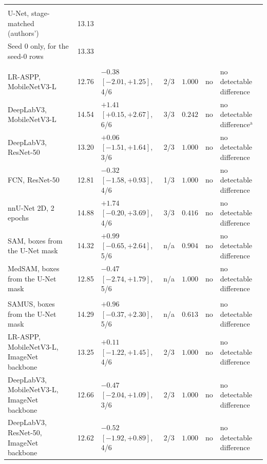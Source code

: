 \begin{table}[tp]
\begin{tabularx}{\textwidth}{@{}>{\raggedright\arraybackslash}X r l c r c >{\raggedright\arraybackslash}p{}@{}}
\multicolumn{7}{@{}l}{\quad\textit{Reference}} \\
\quad U-Net, stage-matched (authors')~\cite{ronneberger2015unet} & 13.13 &  &  &  &  &  \\
\quad\quad Seed 0 only, for the seed-0 rows & 13.33 &  &  &  &  &  \\
\multicolumn{7}{@{}l}{\quad\textit{Family ($m = 7$)}} \\
\quad LR-ASPP, MobileNetV3-L~\cite{howard2019mobilenetv3} & 12.76 & $-0.38$ $[-2.01, +1.25]$, 4/6 & 2/3 & $1.000$ & no & no detectable difference \\
\quad DeepLabV3, MobileNetV3-L~\cite{chen2017deeplabv3,howard2019mobilenetv3} & 14.54 & $+1.41$ $[+0.15, +2.67]$, 6/6 & 3/3 & $0.242$ & no & no detectable difference$^{\mathrm{a}}$ \\
\quad DeepLabV3, ResNet-50~\cite{chen2017deeplabv3,he2016resnet} & 13.20 & $+0.06$ $[-1.51, +1.64]$, 3/6 & 2/3 & $1.000$ & no & no detectable difference \\
\quad FCN, ResNet-50~\cite{long2015fcn,he2016resnet} & 12.81 & $-0.32$ $[-1.58, +0.93]$, 4/6 & 1/3 & $1.000$ & no & no detectable difference \\
\quad nnU-Net 2D, 2 epochs~\cite{isensee2021nnunet} & 14.88 & $+1.74$ $[-0.20, +3.69]$, 4/6 & 3/3 & $0.416$ & no & no detectable difference \\
\quad SAM, boxes from the U-Net mask~\cite{kirillov2023sam} & 14.32 & $+0.99$ $[-0.65, +2.64]$, 5/6 & n/a & $0.904$ & no & no detectable difference \\
\quad MedSAM, boxes from the U-Net mask~\cite{ma2024medsam} & 12.85 & $-0.47$ $[-2.74, +1.79]$, 5/6 & n/a & $1.000$ & no & no detectable difference \\
\multicolumn{7}{@{}l}{\quad\textit{Second mask-source family ($m = 5$)}} \\
\quad SAMUS, boxes from the U-Net mask~\cite{lin2024samus} & 14.29 & $+0.96$ $[-0.37, +2.30]$, 5/6 & n/a & $0.613$ & no & no detectable difference \\
\quad LR-ASPP, MobileNetV3-L, ImageNet backbone~\cite{howard2019mobilenetv3} & 13.25 & $+0.11$ $[-1.22, +1.45]$, 4/6 & 2/3 & $1.000$ & no & no detectable difference \\
\quad DeepLabV3, MobileNetV3-L, ImageNet backbone~\cite{chen2017deeplabv3,howard2019mobilenetv3} & 12.66 & $-0.47$ $[-2.04, +1.09]$, 3/6 & 2/3 & $1.000$ & no & no detectable difference \\
\quad DeepLabV3, ResNet-50, ImageNet backbone~\cite{chen2017deeplabv3,he2016resnet} & 12.62 & $-0.52$ $[-1.92, +0.89]$, 4/6 & 2/3 & $1.000$ & no & no detectable difference \\

\end{tabularx}
\end{table}
